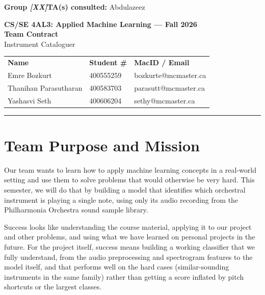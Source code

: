 \documentclass[12pt]{article}
\newcommand{\todo}[1]{\textcolor[HTML]{C0392B}{\textit{[#1]}}}
\begin{document}
\noindent\textbf{Group \todo{XX}}\hfill\textbf{TA(s) consulted:} Abdulazeez

\vspace{0.2em}
\begin{center}
  \textbf{CS/SE 4AL3: Applied Machine Learning --- Fall 2026}\\
  \textbf{Team Contract}\\
  Instrument Cataloguer

  \vspace{0.6em}
  \begin{tabular}{lll}
    \textbf{Name} & \textbf{Student \#} & \textbf{MacID / Email} \\
    Emre Bozkurt          & 400555259 & bozkurte@mcmaster.ca \\
    Thanihan Parasutharan & 400583703 & parasutt@mcmaster.ca \\
    Yashasvi Seth         & 400606204 & sethy@mcmaster.ca \\
  \end{tabular}
\end{center}

\vspace{-0.4em}
\noindent\rule{\linewidth}{0.5pt}

\section{Team Purpose and Mission}

Our team wants to learn how to apply machine learning concepts in a real-world setting and use them to solve problems that would otherwise be very hard. This semester, we will do that by building a model that identifies which orchestral instrument is playing a single note, using only its audio recording from the Philharmonia Orchestra sound sample library.

Success looks like understanding the course material, applying it to our project and other problems, and using what we have learned on personal projects in the future. For the project itself, success means building a working classifier that we fully understand, from the audio preprocessing and spectrogram features to the model itself, and that performs well on the hard cases (similar-sounding instruments in the same family) rather than getting a score inflated by pitch shortcuts or the largest classes.

\end{document}

